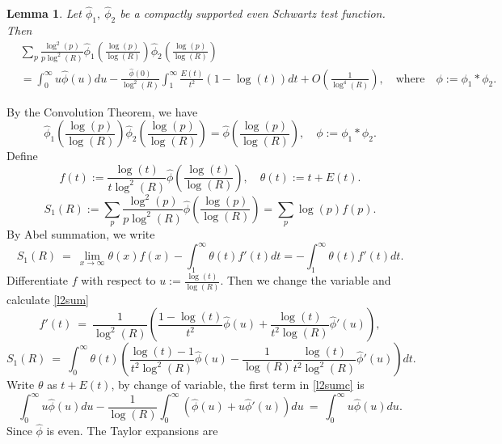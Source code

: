 \documentclass[11pt, reqno]{amsart}
\makeatletter
\renewenvironment{proof}[1][\proofname]{\par
  \vspace{-.7\topsep}%
  \pushQED{\qed}%
  \normalfont
  \topsep0pt \partopsep0pt %
  \trivlist
  \item[\hskip\labelsep
        \itshape
    #1\@addpunct{.}]\ignorespaces
}{%
  \popQED\endtrivlist\@endpefalse
  \addvspace{6pt plus 6pt} %
}
\newtheorem{lemma}[theorem]{Lemma}
\theoremstyle{definition}
\theoremstyle{remark}
\numberwithin{equation}{section}
\renewcommand{\hat}{\widehat}
\makeatother
\begin{document}
\begin{lemma}
Let $\hat\phi_1, \ \hat\phi_2$ be a compactly supported even Schwartz test function. Then
\[
\begin{aligned}
&\sum_p \frac{\log^2(p)}{p\log^2(R)} \hat\phi_1\left(\frac{\log(p)}{\log(R)}\right) \hat\phi_2\left(\frac{\log(p)}{\log(R)} \right)\\
&= \int_0^\infty u\hat\phi(u)du -\frac{\hat\phi(0)}{\log^2(R)}\int_1^{\infty}\frac{E(t)}{t^2}(1-\log(t))dt + O\left(\frac{1}{\log^4(R)}\right),
\quad \text{where} \quad \phi:=\phi_1*\phi_2.
\end{aligned}
\]
\end{lemma}
\begin{proof}
By the Convolution Theorem, we have
\begin{equation}
\hat\phi_1\left(\frac{\log(p)}{\log(R)}\right)
\hat\phi_2\left(\frac{\log(p)}{\log(R)}\right)
=\hat\phi\left(\frac{\log(p)}{\log(R)}\right),
\quad \phi:=\phi_1*\phi_2.
\end{equation}
Define
\[
f(t) := \frac{\log(t)}{t\log^2(R)}\hat\phi\left(\frac{\log(t)}{\log(R)}\right),
\quad \theta(t) := t + E(t).
\]
\[
S_1(R) := \sum_{p} \frac{\log^2(p)}{p\log^2(R)} \hat\phi\left(\frac{\log(p)}{\log(R)}\right) = \sum_p \log(p)f(p).
\]
By Abel summation, we write
\begin{equation}
S_1(R) \ = \ \lim_{x \to \infty}\theta(x)f(x) -\int_1^{\infty}\theta(t)f'(t)dt
= -\int_1^{\infty}\theta(t)f'(t)dt. \label{l2sum}
\end{equation}
Differentiate $f$ with respect to $u := \frac{\log(t)}{\log(R)}$. Then we change the variable and calculate \eqref{l2sum}
\begin{equation}
f'(t) \ = \ \frac{1}{\log^2(R)}\left(\frac{1-\log(t)}{t^{2}}\hat\phi(u) 
+ \frac{\log(t)}{t^2 \log(R)} \hat\phi'(u)\right),
\end{equation}
\begin{equation}
S_1(R) \ = \ \int_0^\infty \theta(t)\left(\frac{\log(t) - 1}{t^2\log^2(R)} \hat\phi(u) - \frac{1}{\log(R)} \frac{\log(t)}{t^2 \log^2(R)}\hat\phi'(u)\right)dt. \label{l2sumc}
\end{equation}
Write $\theta$ as $t + E(t)$, by change of variable, the first term in \eqref{l2sumc} is
\begin{equation}
\int_0^\infty u\hat\phi(u)du - \frac{1}{\log(R)} \int_0^\infty \left(\hat\phi(u) + u\hat\phi'(u)\right)du
\ = \ \int_0^\infty u\hat\phi(u)du.
\end{equation}
Since $\hat\phi$ is even. The Taylor expansions are
\begin{equation}

\end{equation}
\end{proof}
\end{document}
